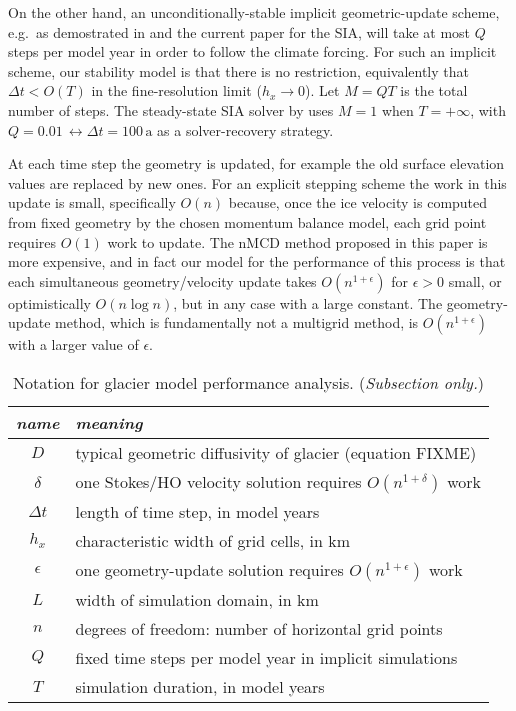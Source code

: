 \documentclass[twocolumn,letterpaper]{igs}
\newcommand\eps{\epsilon}
\begin{document}
On the other hand, an unconditionally-stable implicit geometric-update scheme, e.g.~as demostrated in \citep{Bueler2016} and the current paper for the SIA, will take at most $Q$ steps per model year in order to follow the climate forcing.  For such an implicit scheme, our stability model is that there is no restriction, equivalently that $\Delta t < O(T)$ in the fine-resolution limit ($h_x \to 0$).  Let $M=QT$ is the total number of steps.  The steady-state SIA solver by \cite{Bueler2016} uses $M=1$ when $T=+\infty$, with $Q=0.01 \, \leftrightarrow \Delta t = 100 \,\text{a}$ as a solver-recovery strategy.

At each time step the geometry is updated, for example the old surface elevation values are replaced by new ones.  For an explicit stepping scheme the work in this update is small, specifically $O(n)$ because, once the ice velocity is computed from fixed geometry by the chosen momentum balance model, each grid point requires $O(1)$ work to update.  The nMCD method proposed in this paper is more expensive, and in fact our model for the performance of this process is that each simultaneous geometry/velocity update takes $O(n^{1+\eps})$ for $\eps > 0$ small, or optimistically $O(n \log n)$, but in any case with a large constant.  The \cite{Bueler2016} geometry-update method, which is fundamentally not a multigrid method, is $O(n^{1+\eps})$ with a larger value of $\eps$.

\begin{table}
\begin{center}
\begin{tabular}{c|l}
\emph{name} & \emph{meaning} \\ \hline
$D$ & typical geometric diffusivity of glacier (equation FIXME) \\
$\delta$ & one Stokes/HO velocity solution requires $O(n^{1+\delta})$ work\\
$\Delta t$ & length of time step, in model years \\
$h_x$ & characteristic width of grid cells, in km \\
$\eps$ & one geometry-update solution requires $O(n^{1+\eps})$ work \\
$L$ & width of simulation domain, in km \\
$n$ & degrees of freedom: number of horizontal grid points \\
$Q$ & fixed time steps per model year in implicit simulations \\
$T$ & simulation duration, in model years \\
\end{tabular}
\end{center}

\medskip
\caption{Notation for glacier model performance analysis.  (\emph{Subsection only.})}
\label{tab:performanceconstants}
\end{table}
\end{document}
